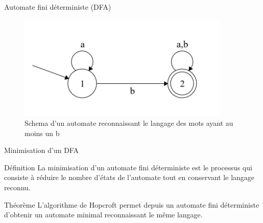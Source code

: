 \documentclass{beamer}
\begin{document}
    \begin{frame}{Automate fini déterministe (DFA)}
        \begin{figure}[t]
            \includegraphics[width=0.9\textwidth]{images/automaton.png}
            \caption{Schema d'un automate reconnaissant le langage des mots ayant au 
            moins un b}
        \end{figure}
    \end{frame}
    \begin{frame}{Minimisation d'un DFA}
        \begin{alert}{Définition}
            La minimisation d'un automate fini déterministe est le processus 
            qui consiste à réduire le nombre d'états de l'automate tout en 
            conservant le langage reconnu. 
        \end{alert}
        \begin{block}{Théorème}
            L'algorithme de Hopcroft permet depuis un automate fini déterministe 
            d'obtenir un automate minimal reconnaissant le même langage.
        \end{block}
    \end{frame}
\end{document}
